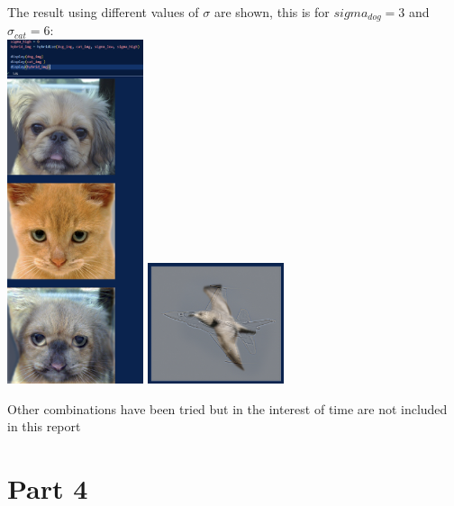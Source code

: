 \documentclass[12pt]{article}
\begin{document}
The result using different values of $\sigma$ are shown, this is for $sigma_{dog}=3$ and $\sigma_{cat}=6$:\\
\includegraphics[width=0.3\textwidth]{imgs/pt3-2.png}
\includegraphics[width=0.3\textwidth]{imgs/pt3-3.png}

Other combinations have been tried but in the interest of time are not included in this report

\section*{Part 4}
\end{document}
